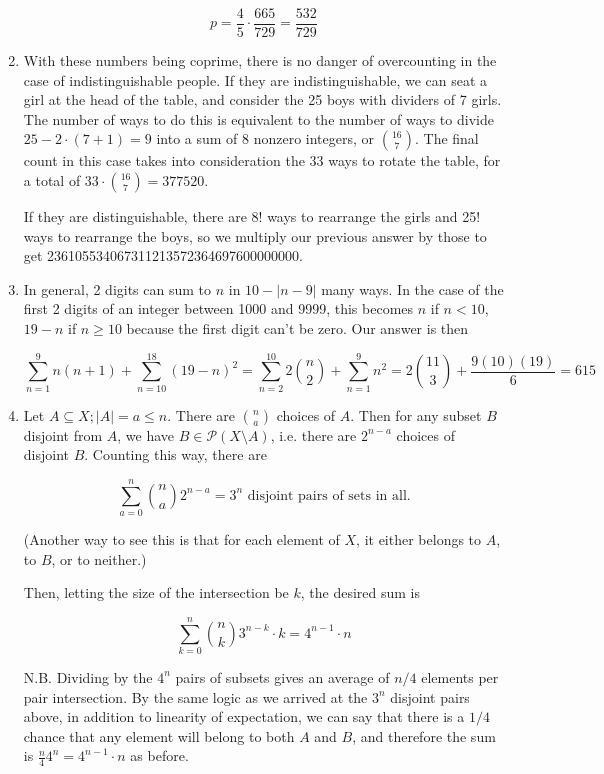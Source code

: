 \documentclass{book}
\numberwithin{equation}{section}
\begin{document}
\begin{enumerate}[label={9.\arabic*}]
$$p = \frac{4}{5}\cdot\frac{665}{729} = \frac{532}{729}$$

\item
With these numbers being coprime, there is no danger of overcounting in the case of indistinguishable people.
If they are indistinguishable, we can seat a girl at the head of the table, and consider the 25 boys with
dividers of 7 girls. The number of ways to do this is equivalent to the number of ways to divide $25 - 2\cdot(7+1)
= 9$ into a sum of 8 nonzero integers, or ${16 \choose 7}$. The final count in this case takes into consideration
the 33 ways to rotate the table, for a total of $33\cdot{16 \choose 7} = 377520$.

If they are distinguishable, there are 8! ways to rearrange the girls and 25! ways to rearrange the boys, so we
multiply our previous answer by those to get 236105534067311213572364697600000000.

\item
In general, 2 digits can sum to $n$ in $10 - |n - 9|$ many ways. In the case of the first 2 digits of an integer between
1000 and 9999, this becomes $n$ if $n < 10$, $19-n$ if $n \geq 10$ because the first digit can't be zero. Our answer is
then

$$\sum_{n=1}^9 n(n+1) + \sum_{n=10}^{18} (19-n)^2 = \sum_{n=2}^{10} 2{n \choose 2} + \sum_{n=1}^9 n^2 = 2{11 \choose 3} + \frac{9(10)(19)}{6} = 615$$

\item
Let $A \subseteq X; |A| = a \leq n$. There are ${n \choose a}$ choices of $A$.
Then for any subset $B$ disjoint from $A$, we have $B \in \mathcal{P}(X\setminus A)$,
i.e. there are $2^{n-a}$ choices of disjoint $B$. Counting this way, there are

$$\sum_{a=0}^{n} {n \choose a} 2^{n-a} = 3^n \text{ disjoint pairs of sets in all.}$$

(Another way to see this is that for each element of $X$, it either belongs to $A$, to $B$, or to neither.)

Then, letting the size of the intersection be $k$, the desired sum is

$$\sum_{k=0}^n {n \choose k}3^{n-k}\cdot k = 4^{n-1}\cdot n$$

N.B. Dividing by the $4^n$ pairs of subsets gives an average of $n/4$ elements per pair intersection. By the same logic
as we arrived at the $3^n$ disjoint pairs above, in addition to linearity of expectation, we can say that there is a
$1/4$ chance that any element will belong to both $A$ and $B$, and therefore the sum is $\frac{n}{4}4^n = 4^{n-1}\cdot n$
as before.


\end{enumerate}
\end{document}
